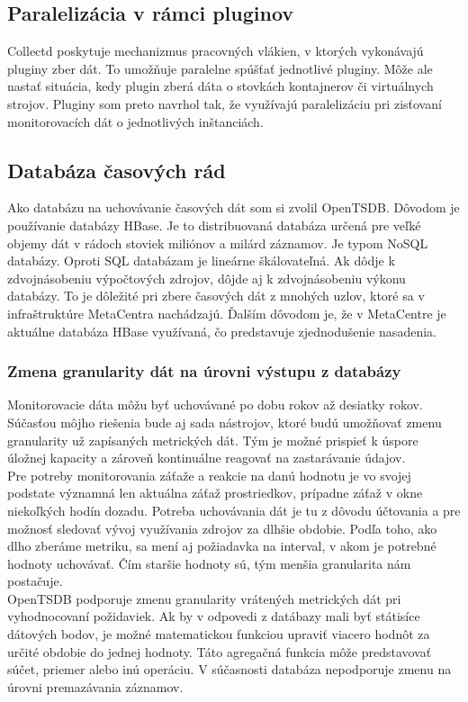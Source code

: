 \documentclass[printed,11pt,twoside,color,cover,table]{fithesis3}
\begin{document}
\subsection{Paralelizácia v rámci pluginov}
Collectd poskytuje mechanizmus pracovných vlákien, v ktorých vykonávajú pluginy zber dát. To umožňuje paralelne spúšťať jednotlivé pluginy.
Môže ale nastať situácia, kedy plugin zberá dáta o stovkách kontajnerov či virtuálnych strojov. Pluginy som preto navrhol tak, že využívajú
paralelizáciu pri zisťovaní monitorovacích dát o jednotlivých inštanciách. 

\subsection{Databáza časových rád}
Ako databázu na uchovávanie časových dát som si zvolil OpenTSDB. Dôvodom je používanie databázy HBase. Je to distribuovaná databáza určená pre veľké objemy dát v rádoch stoviek miliónov a milárd záznamov. 
Je typom NoSQL databázy. Oproti SQL databázam je lineárne škálovateľná. Ak dôdje k zdvojnásobeniu výpočtových zdrojov, dôjde aj k zdvojnásobeniu výkonu databázy. To je dôležité pri zbere časových dát z mnohých
uzlov, ktoré sa v infraštruktúre MetaCentra nachádzajú. Ďalším dôvodom je, že v MetaCentre je aktuálne databáza HBase využívaná, čo predstavuje zjednodušenie nasadenia. 

\subsubsection{Zmena granularity dát na úrovni výstupu z databázy}
Monitorovacie dáta môžu byť uchovávané po dobu rokov až desiatky rokov. Súčasťou môjho riešenia bude aj sada nástrojov, ktoré budú
umožňovať zmenu granularity už zapísaných metrických dát. Tým je možné prispieť k úspore úložnej kapacity a zároveň kontinuálne reagovať na
zastarávanie údajov. 
\\Pre potreby monitorovania záťaže a reakcie na danú hodnotu je vo svojej podstate významná len aktuálna záťaž prostriedkov, prípadne záťaž v okne niekoľkých hodín 
dozadu. Potreba uchovávania dát je tu z dôvodu účtovania a pre možnosť sledovať vývoj využívania zdrojov za dlhšie obdobie.
Podľa toho, ako dlho zberáme metriku, sa mení aj požiadavka na interval, v akom je potrebné hodnoty uchovávať. Čím staršie hodnoty sú, tým menšia granularita nám postačuje.
\\OpenTSDB podporuje zmenu granularity vrátených metrických dát pri vyhodnocovaní požidaviek. Ak by v odpovedi z datábazy mali byť státisíce dátových bodov, je možné matematickou funkciou upraviť viacero hodnôt
za určité obdobie  do jednej hodnoty. Táto agregačná funkcia môže predstavovať súčet, priemer alebo inú operáciu. V súčasnosti databáza nepodporuje zmenu na úrovni premazávania záznamov.
  
\end{document}
